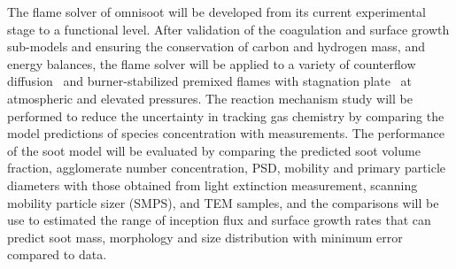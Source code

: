 The flame solver of omnisoot will be developed from its current experimental stage to a functional level. After validation of the coagulation and surface growth sub-models and ensuring the conservation of carbon and hydrogen mass, and energy balances, the flame solver will be applied to a variety of counterflow diffusion~\citep{gleason2021pahs, gleason2023soot} and burner-stabilized premixed flames\citep{abid2009quantitative} with stagnation plate~\citep{camacho2015mobility} at atmospheric and elevated pressures. The reaction mechanism study will be performed to reduce the uncertainty in tracking gas chemistry by comparing the model predictions of species concentration with measurements. The performance of the soot model will be evaluated by comparing the predicted soot volume fraction, agglomerate number concentration, PSD, mobility and primary particle diameters with those obtained from light extinction measurement, scanning mobility particle sizer (SMPS), and TEM samples, and the comparisons will be use to estimated the range of inception flux and surface growth rates that can predict soot mass, morphology and size distribution with minimum error compared to data.




% 





